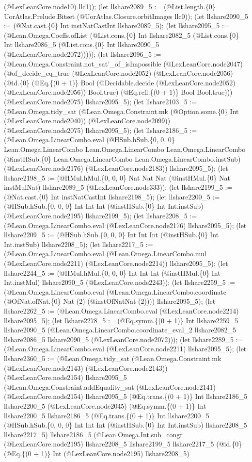 \documentclass[11pt]{article}
\begin{document}
(@LexLeanCore.node10) llc1)); (let llshare2089\_5 := (@List.length.\{0\} UorAtlas.Prelude.Bitset (@UorAtlas.Closure.orbitImages llc0)); (let llshare2090\_5 := (@Nat.cast.\{0\} Int instNatCastInt llshare2089\_5); (let llshare2095\_5 := (@Lean.Omega.Coeffs.ofList (@List.cons.\{0\} Int llshare2082\_5 (@List.cons.\{0\} Int llshare2086\_5 (@List.cons.\{0\} Int llshare2090\_5 (@LexLeanCore.node2072))))); (let llshare2096\_5 := (@Lean.Omega.Constraint.not\_sat'\_of\_isImpossible (@LexLeanCore.node2047) (@of\_decide\_eq\_true (@LexLeanCore.node2052) (@LexLeanCore.node2056) (@id.\{0\} (@Eq.\{(0 + 1)\} Bool (@Decidable.decide (@LexLeanCore.node2052) (@LexLeanCore.node2056)) Bool.true) (@Eq.refl.\{(0 + 1)\} Bool Bool.true))) (@LexLeanCore.node2075) llshare2095\_5); (let llshare2103\_5 := (@Lean.Omega.tidy\_sat (@Lean.Omega.Constraint.mk (@Option.some.\{0\} Int (@LexLeanCore.node2040)) (@LexLeanCore.node2099)) (@LexLeanCore.node2075) llshare2095\_5); (let llshare2186\_5 := (@Lean.Omega.LinearCombo.eval (@HSub.hSub.\{0, 0, 0\} Lean.Omega.LinearCombo Lean.Omega.LinearCombo Lean.Omega.LinearCombo (@instHSub.\{0\} Lean.Omega.LinearCombo Lean.Omega.LinearCombo.instSub) (@LexLeanCore.node2176) (@LexLeanCore.node2183)) llshare2095\_5); (let llshare2198\_5 := (@HMul.hMul.\{0, 0, 0\} Nat Nat Nat (@instHMul.\{0\} Nat instMulNat) llshare2089\_5 (@LexLeanCore.node333)); (let llshare2199\_5 := (@Nat.cast.\{0\} Int instNatCastInt llshare2198\_5); (let llshare2200\_5 := (@HSub.hSub.\{0, 0, 0\} Int Int Int (@instHSub.\{0\} Int Int.instSub) (@LexLeanCore.node2195) llshare2199\_5); (let llshare2208\_5 := (@Lean.Omega.LinearCombo.eval (@LexLeanCore.node2176) llshare2095\_5); (let llshare2209\_5 := (@HSub.hSub.\{0, 0, 0\} Int Int Int (@instHSub.\{0\} Int Int.instSub) llshare2208\_5); (let llshare2217\_5 := (@Lean.Omega.LinearCombo.eval (@Lean.Omega.LinearCombo.mul (@LexLeanCore.node2211) (@LexLeanCore.node2214)) llshare2095\_5); (let llshare2244\_5 := (@HMul.hMul.\{0, 0, 0\} Int Int Int (@instHMul.\{0\} Int Int.instMul) llshare2090\_5 (@LexLeanCore.node2243)); (let llshare2259\_5 := (@Lean.Omega.LinearCombo.eval (@Lean.Omega.LinearCombo.coordinate (@OfNat.ofNat.\{0\} Nat (2) (@instOfNatNat (2)))) llshare2095\_5); (let llshare2262\_5 := (@Lean.Omega.LinearCombo.eval (@LexLeanCore.node2214) llshare2095\_5); (let llshare2278\_5 := (@Eq.symm.\{(0 + 1)\} Int llshare2259\_5 llshare2090\_5 (@Lean.Omega.LinearCombo.coordinate\_eval\_2 llshare2082\_5 llshare2086\_5 llshare2090\_5 (@LexLeanCore.node2072))); (let llshare2289\_5 := (@Lean.Omega.LinearCombo.eval (@LexLeanCore.node2211) llshare2095\_5); (let llshare2360\_5 := (@Lean.Omega.tidy\_sat (@Lean.Omega.Constraint.mk (@LexLeanCore.node2143) (@LexLeanCore.node2143)) (@LexLeanCore.node2154) llshare2095\_5 (@Lean.Omega.Constraint.addEquality\_sat (@LexLeanCore.node2141) (@LexLeanCore.node2154) llshare2095\_5 (@Eq.trans.\{(0 + 1)\} Int llshare2186\_5 llshare2200\_5 (@LexLeanCore.node2045) (@Eq.symm.\{(0 + 1)\} Int llshare2200\_5 llshare2186\_5 (@Eq.trans.\{(0 + 1)\} Int llshare2200\_5 (@HSub.hSub.\{0, 0, 0\} Int Int Int (@instHSub.\{0\} Int Int.instSub) llshare2208\_5 llshare2217\_5) llshare2186\_5 (@Lean.Omega.Int.sub\_congr (@LexLeanCore.node2195) llshare2208\_5 llshare2199\_5 llshare2217\_5 (@id.\{0\} (@Eq.\{(0 + 1)\} Int (@LexLeanCore.node2195) llshare2208\_5) 
\end{document}
